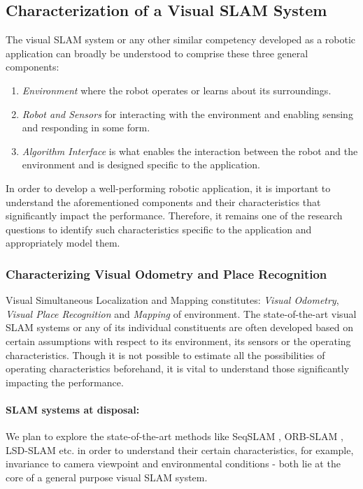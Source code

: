 \documentclass{article}
\begin{document}

\subsection{Characterization of a Visual SLAM System}
The visual SLAM system or any other similar competency developed as a robotic application can broadly be understood to comprise these three general components:
\begin{enumerate}
 \item \emph{Environment} where the robot operates or learns about its surroundings.
 \item \emph{Robot and Sensors} for interacting with the environment and enabling sensing and responding in some form.
 \item \emph{Algorithm Interface} is what enables the interaction between the robot and the environment and is designed specific to the application.
\end{enumerate}

In order to develop a well-performing robotic application, it is important to understand the aforementioned components and their characteristics that significantly impact the performance. Therefore, it remains one of the research questions to identify such characteristics specific to the application and appropriately model them.

\subsubsection{Characterizing Visual Odometry and Place Recognition}
Visual Simultaneous Localization and Mapping constitutes: \emph{Visual Odometry}, \emph{Visual Place Recognition} and \emph{Mapping} of environment. The state-of-the-art visual SLAM systems or any of its individual constituents are often developed based on certain assumptions with respect to its environment, its sensors or the operating characteristics. Though it is not possible to estimate all the possibilities of operating characteristics beforehand, it is vital to understand those significantly impacting the performance.

\paragraph{SLAM systems at disposal:}We plan to explore the state-of-the-art methods like SeqSLAM \cite{Milford2012}, ORB-SLAM \cite{Mur-Artal2015}, LSD-SLAM \cite{Engel2014lsd} etc. in order to understand their certain characteristics, for example, invariance to camera viewpoint and environmental conditions - both lie at the core of a general purpose visual SLAM system.
\end{document}

